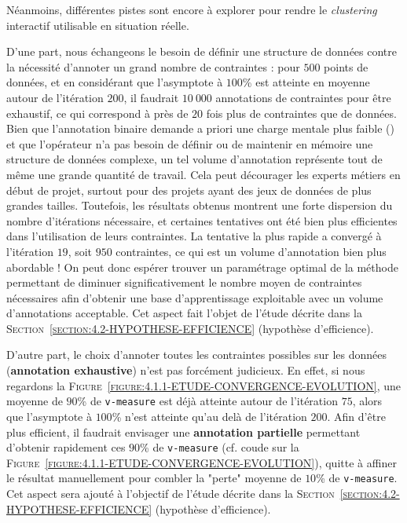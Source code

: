 			
			Néanmoins, différentes pistes sont encore à explorer pour rendre le \textit{clustering} interactif utilisable en situation réelle.
			
			D'une part, nous échangeons le besoin de définir une structure de données contre la nécessité d'annoter un grand nombre de contraintes : pour $500$ points de données, et en considérant que l'asymptote à $100$\% est atteinte en moyenne autour de l'itération $200$, il faudrait $10~000$ annotations de contraintes pour être exhaustif, ce qui correspond à près de $20$ fois plus de contraintes que de données.
			Bien que l'annotation binaire demande a priori une charge mentale plus faible (\cite{hart-staveland:1988:development-nasatlx-task}) et que l'opérateur n'a pas besoin de définir ou de maintenir en mémoire une structure de données complexe, un tel volume d'annotation représente tout de même une grande quantité de travail.
			Cela peut décourager les experts métiers en début de projet, surtout pour des projets ayant des jeux de données de plus grandes tailles.
			Toutefois, les résultats obtenus montrent une forte dispersion du nombre d'itérations nécessaire, et certaines tentatives ont été bien plus efficientes dans l'utilisation de leurs contraintes. La tentative la plus rapide a convergé à l'itération $19$, soit $950$ contraintes, ce qui est un volume d'annotation bien plus abordable !
			On peut donc espérer trouver un paramétrage optimal de la méthode permettant de diminuer significativement le nombre moyen de contraintes nécessaires afin d'obtenir une base d'apprentissage exploitable avec un volume d'annotations acceptable.
			Cet aspect fait l'objet de l'étude décrite dans la \textsc{Section~\ref{section:4.2-HYPOTHESE-EFFICIENCE}} (hypothèse d'efficience).
			
			D'autre part, le choix d'annoter toutes les contraintes possibles sur les données (\textbf{annotation exhaustive}) n'est pas forcément judicieux.
			En effet, si nous regardons la \textsc{Figure~\ref{figure:4.1.1-ETUDE-CONVERGENCE-EVOLUTION}}, une moyenne de $90$\% de \texttt{v-measure} est déjà atteinte autour de l'itération $75$, alors que l'asymptote à $100$\% n'est atteinte qu'au delà de l'itération $200$.
			Afin d'être plus efficient, il faudrait envisager une \textbf{annotation partielle} permettant d'obtenir rapidement ces $90$\% de \texttt{v-measure} (cf. coude sur la \textsc{Figure~\ref{figure:4.1.1-ETUDE-CONVERGENCE-EVOLUTION}}), quitte à affiner le résultat manuellement pour combler la "perte" moyenne de $10$\% de \texttt{v-measure}.
			Cet aspect sera ajouté à l'objectif de l'étude décrite dans la \textsc{Section~\ref{section:4.2-HYPOTHESE-EFFICIENCE}} (hypothèse d'efficience).
			
